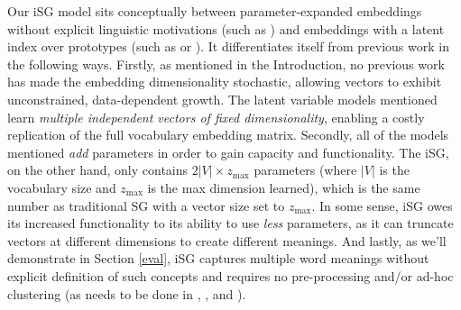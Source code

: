 \documentclass{article} %
\begin{document}
Our iSG model sits conceptually between parameter-expanded embeddings without explicit linguistic motivations (such as \cite{vilnis2014word}) and embeddings with a latent index over prototypes (such as \cite{tian2014probabilistic} or \cite{bartunov2015breaking}).  It differentiates itself from previous work in the following ways.  Firstly, as mentioned in the Introduction, no previous work has made the embedding dimensionality stochastic, allowing vectors to exhibit unconstrained, data-dependent growth.  The latent variable models mentioned learn \emph{multiple independent vectors of fixed dimensionality}, enabling a costly replication of the full vocabulary embedding matrix.  Secondly, all of the models mentioned \emph{add} parameters in order to gain capacity and functionality.  The iSG, on the other hand, only contains $2|V| \times z_{\text{max}}$ parameters (where $|V|$ is the vocabulary size and $z_{\text{max}}$ is the max dimension learned), which is the same number as traditional SG with a vector size set to $z_{\text{max}}$.  In some sense, iSG owes its increased functionality to its ability to use \emph{less} parameters, as it can truncate vectors at different dimensions to create different meanings.  And lastly, as we'll demonstrate in Section \ref{eval}, iSG captures multiple word meanings without explicit definition of such concepts and requires no pre-processing and/or ad-hoc clustering (as needs to be done in \cite{HuangEtAl2012}, \cite{reisinger2010multi}, and \cite{neelakantan2015efficient}).   
\end{document}
